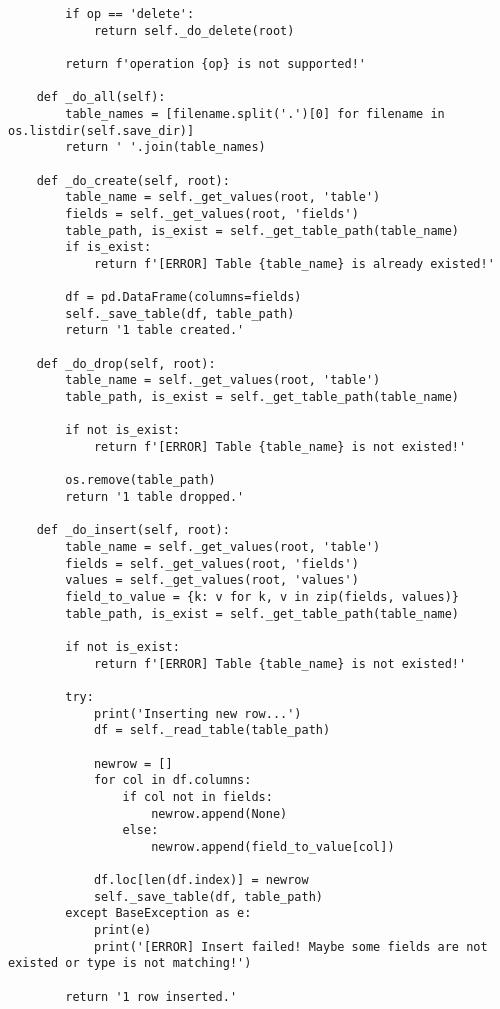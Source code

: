 \begin{appendix}
\begin{lstlisting}
        if op == 'delete':
            return self._do_delete(root)

        return f'operation {op} is not supported!'
    
    def _do_all(self):
        table_names = [filename.split('.')[0] for filename in os.listdir(self.save_dir)]
        return ' '.join(table_names)
    
    def _do_create(self, root):
        table_name = self._get_values(root, 'table')
        fields = self._get_values(root, 'fields')
        table_path, is_exist = self._get_table_path(table_name)
        if is_exist:
            return f'[ERROR] Table {table_name} is already existed!'
        
        df = pd.DataFrame(columns=fields)
        self._save_table(df, table_path)
        return '1 table created.'
    
    def _do_drop(self, root):
        table_name = self._get_values(root, 'table')
        table_path, is_exist = self._get_table_path(table_name)

        if not is_exist:
            return f'[ERROR] Table {table_name} is not existed!'
        
        os.remove(table_path)
        return '1 table dropped.'
 
    def _do_insert(self, root):
        table_name = self._get_values(root, 'table')
        fields = self._get_values(root, 'fields')
        values = self._get_values(root, 'values')
        field_to_value = {k: v for k, v in zip(fields, values)}
        table_path, is_exist = self._get_table_path(table_name)

        if not is_exist:
            return f'[ERROR] Table {table_name} is not existed!'
        
        try:
            print('Inserting new row...')
            df = self._read_table(table_path)

            newrow = []
            for col in df.columns:
                if col not in fields:
                    newrow.append(None)
                else:
                    newrow.append(field_to_value[col])
            
            df.loc[len(df.index)] = newrow
            self._save_table(df, table_path)
        except BaseException as e:
            print(e)
            print('[ERROR] Insert failed! Maybe some fields are not existed or type is not matching!')
            
        return '1 row inserted.'
   

\end{lstlisting}
\end{appendix}
